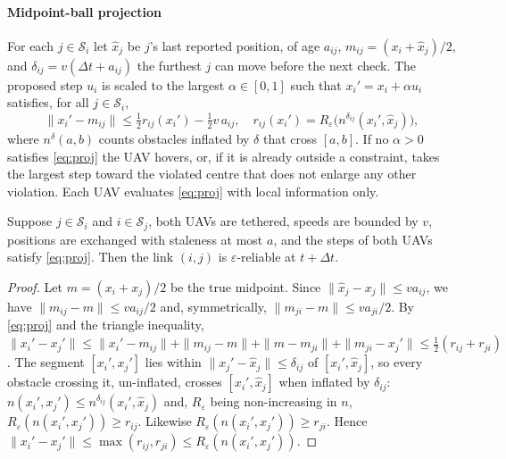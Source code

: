 \paragraph{Midpoint-ball projection}
For each $j\in\mathcal{S}_i$ let $\hat x_j$ be $j$'s last reported position, of age $a_{ij}$,
$m_{ij}=(x_i+\hat x_j)/2$, and $\delta_{ij}=v(\Delta t+a_{ij})$ the furthest $j$ can move before
the next check. The proposed step $u_i$ is scaled to the largest $\alpha\in[0,1]$ such that
$x_i'=x_i+\alpha u_i$ satisfies, for all $j\in\mathcal{S}_i$,
\begin{equation}
\|x_i'-m_{ij}\|\le \tfrac12 r_{ij}(x_i')-\tfrac12 v\,a_{ij},\quad
r_{ij}(x_i')=R_\varepsilon\big(n^{\delta_{ij}}(x_i',\hat x_j)\big),\label{eq:proj}
\end{equation}
where $n^{\delta}(a,b)$ counts obstacles inflated by $\delta$ that cross $[a,b]$. If no
$\alpha>0$ satisfies \eqref{eq:proj} the UAV hovers, or, if it is already outside a constraint,
takes the largest step toward the violated centre that does not enlarge any other violation.
Each UAV evaluates \eqref{eq:proj} with local information only.

\begin{proposition}\label{prop:link}
Suppose $j\in\mathcal{S}_i$ and $i\in\mathcal{S}_j$, both UAVs are tethered, speeds are
bounded by $v$, positions are exchanged with staleness at most $a$, and the steps of both
UAVs satisfy \eqref{eq:proj}. Then the link $(i,j)$ is $\varepsilon$-reliable at $t+\Delta t$.
\end{proposition}
\begin{proof}
Let $m=(x_i+x_j)/2$ be the true midpoint. Since $\|\hat x_j-x_j\|\le va_{ij}$, we have
$\|m_{ij}-m\|\le va_{ij}/2$ and, symmetrically, $\|m_{ji}-m\|\le va_{ji}/2$. By \eqref{eq:proj} and
the triangle inequality,
$\|x_i'-x_j'\|\le\|x_i'-m_{ij}\|+\|m_{ij}-m\|+\|m-m_{ji}\|+\|m_{ji}-x_j'\|\le\tfrac12(r_{ij}+r_{ji})$.
The segment $[x_i',x_j']$ lies within $\|x_j'-\hat x_j\|\le\delta_{ij}$ of $[x_i',\hat x_j]$, so
every obstacle crossing it, un-inflated, crosses $[x_i',\hat x_j]$ when inflated by
$\delta_{ij}$: $n(x_i',x_j')\le n^{\delta_{ij}}(x_i',\hat x_j)$ and, $R_\varepsilon$ being
non-increasing in $n$, $R_\varepsilon(n(x_i',x_j'))\ge r_{ij}$. Likewise
$R_\varepsilon(n(x_i',x_j'))\ge r_{ji}$. Hence
$\|x_i'-x_j'\|\le\max(r_{ij},r_{ji})\le R_\varepsilon(n(x_i',x_j'))$.
\end{proof}

